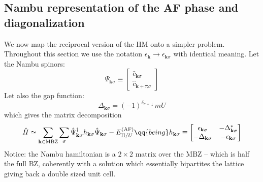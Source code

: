%		
%		

\subsection{Nambu representation of the AF phase and diagonalization}\label{appsubsec:af-nambu}

We now map the reciprocal version of the HM onto a simpler problem. Throughout this section we use the notation $\epsilon_\mathbf{k} \to \epsilon_{\mathbf{k}\sigma}$ with identical meaning. Let the Nambu spinors:
\[
	\hat \Psi_{\mathbf{k}\sigma} \equiv \begin{bmatrix}
		\hat c_{\mathbf{k}\sigma} \\
		\hat c_{\mathbf{k}+\bm{\pi}\sigma} 
	\end{bmatrix}
\]
Let also the gap function:
\[
	\Delta_{\mathbf{k}\sigma} = (-1)^{\delta_{\sigma=\downarrow}} mU
\]
which gives the matrix decomposition
\begin{equation}\label{appeq:af-hk}
	\hat H \simeq \sum_{\mathbf{k} \in \mathrm{MBZ}} \sum_\sigma \hat \Psi_{\mathbf{k}\sigma}^\dagger h_{\mathbf{k}\sigma} \hat \Psi_{\mathbf{k}\sigma} - E_{\mathrm{H}/U}^{(\mathrm{AF})}
	\qq{being}
	h_{\mathbf{k}\sigma} \equiv \begin{bmatrix}
		\epsilon_{\mathbf{k}\sigma} & -\Delta_{\mathbf{k}\sigma}^* \\
		-\Delta_{\mathbf{k}\sigma} & - \epsilon_{\mathbf{k}\sigma}
	\end{bmatrix}
\end{equation}
Notice: the Nambu hamiltonian is a $2\times2$ matrix over the $\mathrm{MBZ}$ -- which is half the full $\mathrm{BZ}$, coherently with a solution which essentially bipartites the lattice giving back a double sized unit cell.

